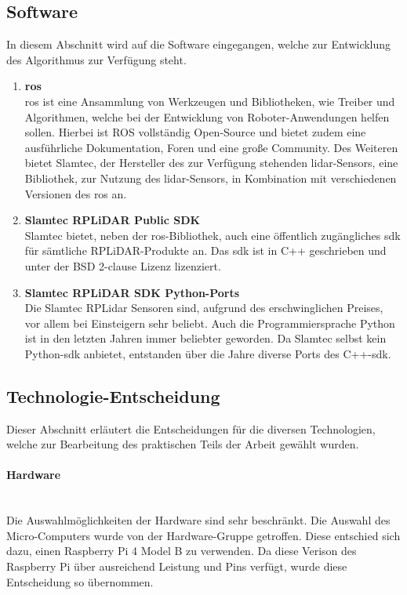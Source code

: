\subsection{Software}
In diesem Abschnitt wird auf die Software eingegangen, welche zur Entwicklung des Algorithmus zur Verfügung steht.

\begin{enumerate}[leftmargin=*]
    \item \textbf{\acf{ros}} \\
    \ac{ros} ist eine Ansammlung von Werkzeugen und Bibliotheken, wie Treiber und Algorithmen, welche bei der Entwicklung von Roboter-Anwendungen helfen sollen. 
    Hierbei ist ROS vollständig Open-Source und bietet zudem eine ausführliche Dokumentation, Foren und eine große Community. \cite{Ros2024}
    Des Weiteren bietet Slamtec, der Hersteller des zur Verfügung stehenden \ac{lidar}-Sensors, eine Bibliothek, zur Nutzung des \ac{lidar}-Sensors, in Kombination mit verschiedenen Versionen des \ac{ros} an. \cite{RplidarRos2023}

    \item \textbf{Slamtec RPLiDAR Public SDK} \\
    Slamtec bietet, neben der \ac{ros}-Bibliothek, auch eine öffentlich zugängliches \ac{sdk} für sämtliche RPLiDAR-Produkte an. 
    Das \ac{sdk} ist in C++ geschrieben und unter der BSD 2-clause Lizenz lizenziert. \cite{RplidarSDK2023}

    \item \textbf{Slamtec RPLiDAR SDK Python-Ports} \\
    Die Slamtec RPLidar Sensoren sind, aufgrund des erschwinglichen Preises, vor allem bei Einsteigern sehr beliebt.
    Auch die Programmiersprache Python ist in den letzten Jahren immer beliebter geworden.
    Da Slamtec selbst kein Python-\ac{sdk} anbietet, entstanden über die Jahre diverse Ports des C++-\ac{sdk}.
\end{enumerate}

\subsection{Technologie-Entscheidung}
Dieser Abschnitt erläutert die Entscheidungen für die diversen Technologien, welche zur Bearbeitung des praktischen Teils der Arbeit gewählt wurden.

\paragraph{Hardware} \mbox{}\\
Die Auswahlmöglichkeiten der Hardware sind sehr beschränkt.
Die Auswahl des Micro-Computers wurde von der Hardware-Gruppe getroffen.
Diese entschied sich dazu, einen Raspberry Pi 4 Model B zu verwenden.
Da diese Verison des Raspberry Pi über ausreichend Leistung und Pins verfügt,
wurde diese Entscheidung so übernommen.

